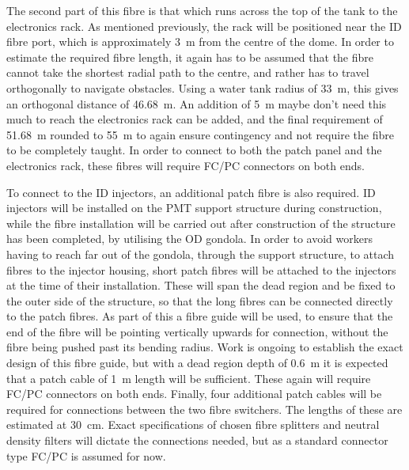 \documentclass[a4paper,11pt]{article}
\begin{document}
The second part of this fibre is that which runs across the top of the tank to the electronics rack. As mentioned previously, the rack will be positioned near the ID fibre port, which is approximately 3~m from the centre of the dome. In order to estimate the required fibre length, it again has to be assumed that the fibre cannot take the shortest radial path to the centre, and rather has to travel orthogonally to navigate obstacles. Using a water tank radius of 33~m, this gives an orthogonal distance of 46.68~m. An addition of 5~m {\color{red} maybe don't need this much} to reach the electronics rack can be added, and the final requirement of 51.68~m rounded to 55~m to again ensure contingency and not require the fibre to be completely taught. In order to connect to both the patch panel and the electronics rack, these fibres will require FC/PC connectors on both ends.

To connect to the ID injectors, an additional patch fibre is also required. ID injectors will be installed on the PMT support structure during construction, while the fibre installation will be carried out after construction of the structure has been completed, by utilising the OD gondola. In order to avoid workers having to reach far out of the gondola, through the support structure, to attach fibres to the injector housing, short patch fibres will be attached to the injectors at the time of their installation. These will span the dead region and be fixed to the outer side of the structure, so that the long fibres can be connected directly to the patch fibres. As part of this a fibre guide will be used, to ensure that the end of the fibre will be pointing vertically upwards for connection, without the fibre being pushed past its bending radius. {\color{red} Work is ongoing to establish the exact design of this fibre guide, but with a dead region depth of 0.6~m it is expected that a patch cable of 1~m length will be sufficient. These again will require FC/PC connectors on both ends.} Finally, four additional patch cables will be required for connections between the two fibre switchers. The lengths of these are estimated at 30~cm. Exact specifications of chosen fibre splitters and neutral density filters will dictate the connections needed, but as a standard connector type FC/PC is assumed for now.
\end{document}
